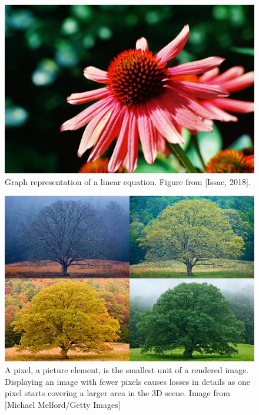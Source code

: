 \begin{figure}
  \centering
   \includegraphics[width=\linewidth]{Images/byRickJones .jpg}
   
   \caption{Graph representation of a linear equation. Figure from [Issac, 2018].}
   \label{fig:neuron}
\end{figure}


\begin{figure}[ht]
  \centering

    \includegraphics[width=\linewidth]{Images/seasonchanges.png}

   \caption{A pixel, a picture element, is the smallest unit of a rendered image. Displaying an image with fewer pixels causes losses in details as one pixel starts covering a larger area in the 3D scene. Image from [Michael Melford/Getty Images]}
   \label{fig:colour-approximate}
\end{figure}



